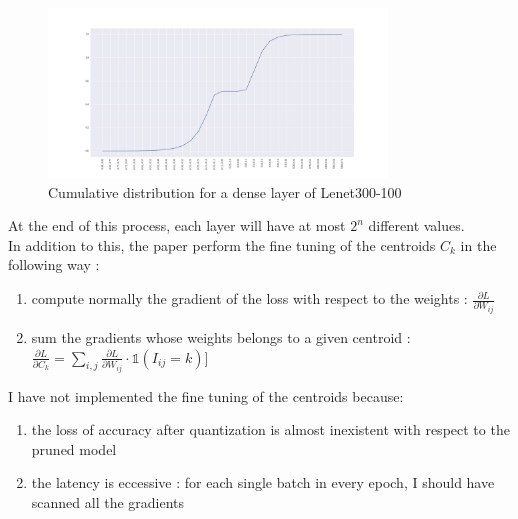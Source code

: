 \documentclass[journal]{vgtc}                %
\begin{document}
\begin{figure}[H]
	\includegraphics[width=90mm,scale=0.7]{cdf}
	\caption{Cumulative distribution for a dense layer of Lenet300-100 }
\end{figure}

At the end of this process, each layer will have at most $2^{n}$ different values.\\In addition to this, the paper perform the fine tuning of the centroids $C_k$ in the following way :
\begin{enumerate}
\item compute normally the gradient of the loss with respect to the weights : $\frac{\partial L}{\partial W_{ij}}$
\item sum the gradients whose weights belongs to a given centroid : $\frac{\partial L}{\partial C_{k}}=\sum\limits_{i,j}\frac{\partial L }{\partial W_{ij}}\cdot \mathbb{1}(I_{ij}=k) ]$
\end{enumerate}
I have not implemented the fine tuning of the centroids because:
\begin{enumerate}
\item the loss of accuracy after quantization is almost inexistent with respect to the pruned model
\item the latency is eccessive : for each single batch in every epoch, I should have scanned all the gradients
\end{enumerate}
\end{document}
